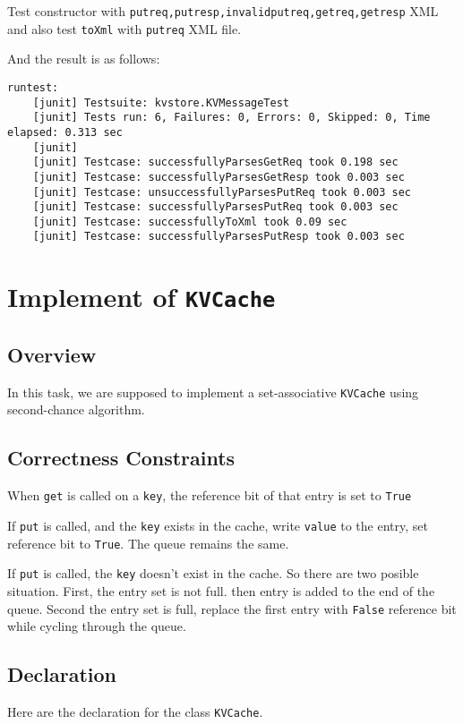 \documentclass{article}
\begin{document}
Test constructor with \texttt{putreq,putresp,invalidputreq,getreq,getresp} XML and also test \texttt{toXml} with \texttt{putreq} XML file.

And the result is as follows:
\begin{lstlisting}
runtest:
    [junit] Testsuite: kvstore.KVMessageTest
    [junit] Tests run: 6, Failures: 0, Errors: 0, Skipped: 0, Time elapsed: 0.313 sec
    [junit] 
    [junit] Testcase: successfullyParsesGetReq took 0.198 sec
    [junit] Testcase: successfullyParsesGetResp took 0.003 sec
    [junit] Testcase: unsuccessfullyParsesPutReq took 0.003 sec
    [junit] Testcase: successfullyParsesPutReq took 0.003 sec
    [junit] Testcase: successfullyToXml took 0.09 sec
    [junit] Testcase: successfullyParsesPutResp took 0.003 sec
\end{lstlisting}

\section{Implement of \texttt{KVCache}}
\subsection{Overview}
In this task, we are supposed to implement a set-associative \texttt{KVCache} using second-chance algorithm.
\subsection{Correctness Constraints}
\begin{compactitem}
\item When \texttt{get} is called on a \texttt{key}, the reference bit of that entry is set to \texttt{True}
\item If \texttt{put} is called, and the \texttt{key} exists in the cache, write \texttt{value} to the entry, set reference bit to \texttt{True}. The queue remains the same.
\item If \texttt{put} is called, the \texttt{key} doesn't exist in the cache. So there are two posible situation. First, the entry set is not full. then entry is added to the end of the queue. Second the entry set is full, replace the first entry with \texttt{False} reference bit while cycling through the queue.
\end{compactitem}
\subsection{Declaration}
Here are the declaration for the class \texttt{KVCache}.
\end{document}
